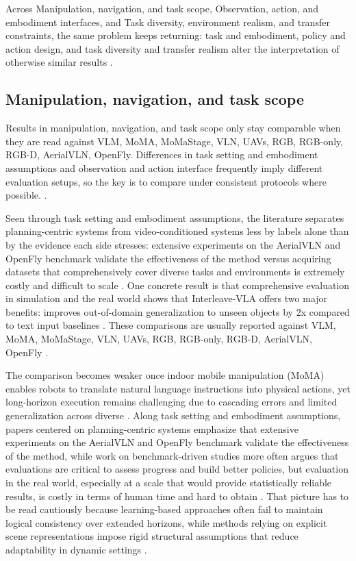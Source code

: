 \documentclass[a4paper,11pt]{article}
\begin{document}
Across Manipulation, navigation, and task scope, Observation, action, and embodiment interfaces, and Task diversity, environment realism, and transfer constraints, the same problem keeps returning: task and embodiment, policy and action design, and task diversity and transfer realism alter the interpretation of otherwise similar results \citep{Din2025Vision,Zheng2024Survey,Zhu2025Objectvla,Doshi2024Scaling}.

\subsection{Manipulation, navigation, and task scope}


Results in manipulation, navigation, and task scope only stay comparable when they are read against VLM, MoMA, MoMaStage, VLN, UAVs, RGB, RGB-only, RGB-D, AerialVLN, OpenFly. Differences in task setting and embodiment assumptions and observation and action interface frequently imply different evaluation setups, so the key is to compare under consistent protocols where possible. \citep{Gundawar2025Bench,Kim2026Molmospaces,Din2025Vision,Zheng2024Survey}.

Seen through task setting and embodiment assumptions, the literature separates planning-centric systems from video-conditioned systems less by labels alone than by the evidence each side stresses: extensive experiments on the AerialVLN and OpenFly benchmark validate the effectiveness of the method versus acquiring datasets that comprehensively cover diverse tasks and environments is extremely costly and difficult to scale \citep{Xu2025Aerial,Kachaev2025Mind,Dai2026Conla}. One concrete result is that comprehensive evaluation in simulation and the real world shows that Interleave-VLA offers two major benefits: improves out-of-domain generalization to unseen objects by 2x compared to text input baselines \citep{Fan2025Interleave}. These comparisons are usually reported against VLM, MoMA, MoMaStage, VLN, UAVs, RGB, RGB-only, RGB-D, AerialVLN, OpenFly \citep{Li2026Momastage,Bai2025Embodied,Kachaev2025Mind,Xu2025Aerial}.

The comparison becomes weaker once indoor mobile manipulation (MoMA) enables robots to translate natural language instructions into physical actions, yet long-horizon execution remains challenging due to cascading errors and limited generalization across diverse \citep{Li2026Momastage}. Along task setting and embodiment assumptions, papers centered on planning-centric systems emphasize that extensive experiments on the AerialVLN and OpenFly benchmark validate the effectiveness of the method, while work on benchmark-driven studies more often argues that evaluations are critical to assess progress and build better policies, but evaluation in the real world, especially at a scale that would provide statistically reliable results, is costly in terms of human time and hard to obtain \citep{Xu2025Aerial,Kachaev2025Mind,Zhou2025Autoeval}. That picture has to be read cautiously because learning-based approaches often fail to maintain logical consistency over extended horizons, while methods relying on explicit scene representations impose rigid structural assumptions that reduce adaptability in dynamic settings \citep{Li2026Momastage}.
\end{document}
